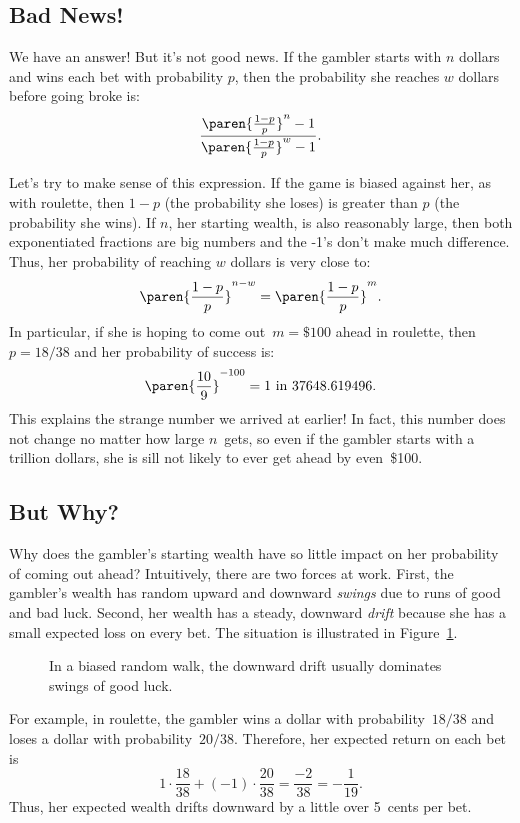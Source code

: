\subsection{Bad News!}

We have an answer!  But it's not good news. If the gambler starts with
$n$ dollars and wins each bet with probability $p$, then the
probability she reaches $w$ dollars before going broke is:
%
\[
\frac{\paren{\frac{1-p}{p}}^n-1}{\paren{\frac{1-p}{p}}^w-1}.
\]

Let's try to make sense of this expression.  If the game is biased
against her, as with roulette, then $1-p$ (the probability she loses)
is greater than $p$ (the probability she wins).  If $n$, her starting
wealth, is also reasonably large, then both exponentiated fractions
are big numbers and the -1's don't make much difference.  Thus, her
probability of reaching $w$ dollars is very close to:
%
\[
    \paren{\frac{1-p}{p}}^{n-w} = \paren{\frac{1 - p}{p}}^m.
\]
%
In particular, if she is hoping to come out~$m = \$100$ ahead in
roulette, then $p = 18/38$ and her probability of success is:
%
\[
    \paren{\frac{10}{9}}^{-100} = 1 \text{ in } 37648.619496.
\]
%
This explains the strange number we arrived at earlier!  In fact, this
number does not change no matter how large $n$~gets, so even if the
gambler starts with a trillion dollars, she is sill not likely to ever
get ahead by even~\$100.

\subsection{But Why?}

Why does the gambler's starting wealth have so little impact on her
probability of coming out ahead?  Intuitively, there are two forces at
work.  First, the gambler's wealth has random upward and downward
\emph{swings} due to runs of good and bad luck.  Second, her wealth
has a steady, downward \emph{drift} because she has a small expected
loss on every bet.  The situation is illustrated in
Figure~\ref{fig:19P3}.
%
\begin{figure}[h]


\caption{In a biased random walk, the downward drift usually dominates
  swings of good luck.}

\label{fig:19P3}

\end{figure}

For example, in roulette, the gambler wins a dollar with
probability~$18/38$ and loses a dollar with probability~$20/38$.
Therefore, her expected return on each bet is
\begin{equation*}
1 \cdot \frac{18}{38} + (-1) \cdot \frac{20}{38}
    = \frac{-2}{38}
    = -\frac{1}{19}.
\end{equation*}
Thus, her expected wealth drifts downward by a little over 5~cents per
bet.

